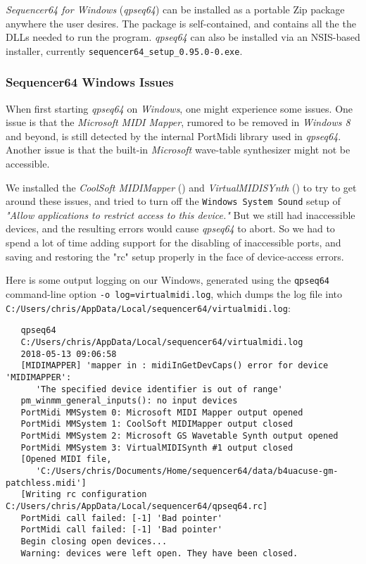    \textsl{Sequencer64 for Windows} (\textsl{qpseq64}) can be installed
   as a portable Zip package anywhere the user desires.  The package is
   self-contained, and contains all the the DLLs needed to run the program.
   \textsl{qpseq64} can also be installed via an NSIS-based installer,
   currently \texttt{sequencer64\_setup\_0.95.0-0.exe}.

\subsubsection{Sequencer64 Windows Issues}
\label{subsubsec:qt_portmidi_windows_setup_issues}

    When first starting \textsl{qpseq64} on \textsl{Windows}, one might
    experience some issues.  One issue is that the \textsl{Microsoft MIDI
    Mapper}, rumored to be removed in \textsl{Windows 8} and beyond, is still
    detected by the internal PortMidi library used in \textsl{qpseq64}.
    Another issue is that the built-in \textsl{Microsoft} wave-table
    synthesizer might not be accessible.

    We installed the
    \textsl{CoolSoft MIDIMapper} (\cite{midimapper}) and
    \textsl{VirtualMIDISYnth} (\cite{midisynth}) to try to get
    around these issues, and tried to turn off the
    \texttt{Windows System Sound} setup of
    \textsl{"Allow applications to restrict access to this device."}
    But we still had
    inaccessible devices, and the resulting errors would cause
    \textsl{qpseq64} to
    abort.  So we had to spend a lot of time adding support for
    the disabling of
    inaccessible ports, and saving and restoring the "rc" setup properly
    in the face of device-access errors.

    Here is some output logging on our Windows, generated using the
    \texttt{qpseq64} command-line option
    \texttt{-o log=virtualmidi.log},
    which dumps the log file into
    \texttt{C:/Users/chris/AppData/Local/sequencer64/virtualmidi.log}:

\begin{verbatim}
   qpseq64 
   C:/Users/chris/AppData/Local/sequencer64/virtualmidi.log 
   2018-05-13 09:06:58 
   [MIDIMAPPER] 'mapper in : midiInGetDevCaps() error for device 'MIDIMAPPER':
      'The specified device identifier is out of range'
   pm_winmm_general_inputs(): no input devices
   PortMidi MMSystem 0: Microsoft MIDI Mapper output opened
   PortMidi MMSystem 1: CoolSoft MIDIMapper output closed
   PortMidi MMSystem 2: Microsoft GS Wavetable Synth output opened
   PortMidi MMSystem 3: VirtualMIDISynth #1 output closed
   [Opened MIDI file,
      'C:/Users/chris/Documents/Home/sequencer64/data/b4uacuse-gm-patchless.midi']
   [Writing rc configuration C:/Users/chris/AppData/Local/sequencer64/qpseq64.rc]
   PortMidi call failed: [-1] 'Bad pointer'
   PortMidi call failed: [-1] 'Bad pointer'
   Begin closing open devices...
   Warning: devices were left open. They have been closed.
\end{verbatim}

